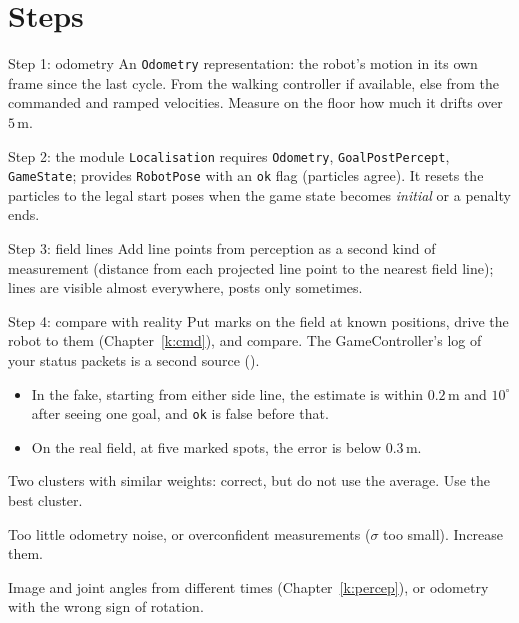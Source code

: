 \section*{Steps}
\begin{stepbox}{Step 1: odometry}
An \texttt{Odometry} representation: the robot's motion in its own frame since the last cycle. From the walking controller if available, else from the commanded and ramped velocities. Measure on the floor how much it drifts over $5$\,m.
\end{stepbox}
\begin{stepbox}{Step 2: the module}
\texttt{Localisation} requires \texttt{Odometry}, \texttt{GoalPostPercept}, \texttt{GameState}; provides \texttt{RobotPose} with an \texttt{ok} flag (particles agree). It resets the particles to the legal start poses when the game state becomes \emph{initial} or a penalty ends.
\end{stepbox}
\begin{stepbox}{Step 3: field lines}
Add line points from perception as a second kind of measurement (distance from each projected line point to the nearest field line); lines are visible almost everywhere, posts only sometimes.
\end{stepbox}
\begin{stepbox}{Step 4: compare with reality}
Put marks on the field at known positions, drive the robot to them (Chapter~\ref{k:cmd}), and compare. The GameController's log of your status packets is a second source ().
\end{stepbox}

\begin{checkbox}
\begin{itemize}[nosep]
  \item In the fake, starting from either side line, the estimate is within $0.2$\,m and $10^\circ$ after seeing one goal, and \texttt{ok} is false before that.
  \item On the real field, at five marked spots, the error is below $0.3$\,m.
\end{itemize}
\end{checkbox}

\begin{troublebox}
\begin{description}[leftmargin=0.6cm,nosep]
  \item[The estimate jumps between two places] Two clusters with similar weights: correct, but do not use the average. Use the best cluster.
  \item[All particles collapse to a wrong place] Too little odometry noise, or overconfident measurements ($\sigma$ too small). Increase them.
  \item[Good while standing, bad while walking] Image and joint angles from different times (Chapter~\ref{k:percep}), or odometry with the wrong sign of rotation.
\end{description}
\end{troublebox}

